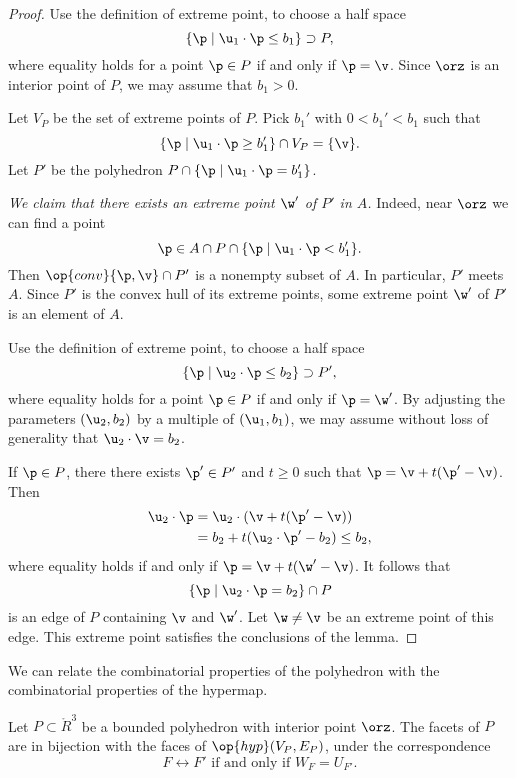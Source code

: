 \begin{proof}  Use the definition of extreme point, to choose a half space
\[
\{ \p \mid \u_1\cdot \p \le b_1\} \supset P,
\]
where equality holds for a point $\p\in P$ if and only if $\p=\v$.
Since $\orz$ is an interior point of $P$, we may assume that $b_1 >0$.

Let $V_P$ be the set of extreme points of $P$.
Pick $b_1'$ with $0<b_1'<b_1$ such that
\[
\{\p \mid \u_1\cdot \p \ge b_1' \} \cap V_P = \{\v\}.
\]
Let $P'$ be the polyhedron 
$P \cap \{\p \mid \u_1 \cdot \p = b_1'\}$.  

{\it We claim that there exists an extreme point $\w'$ of $P'$
in $A$.}  Indeed, near $\orz$ we can find a point 
\[
\p \in A \cap P \cap \{ \p \mid \u_1\cdot \p < b_1'\}.
\]
Then $\op{conv}\{\p,\v\}\cap P'$ is a nonempty subset of $A$.  In
particular, $P'$ meets $A$.  Since $P'$ is the convex hull of its
extreme points, some extreme point $\w'$ of $P'$ is an element of $A$.

Use the definition of extreme point, to choose a half space
\[
\{ \p \mid \u_2 \cdot \p \le b_2\} \supset P',
\]
where equality holds for a point $\p\in P$ if and only if $\p=\w'$.
By adjusting the parameters $(\u_2,b_2)$ by a multiple of
$(\u_1,b_1)$, we may assume without loss of generality that $\u_2\cdot
\v = b_2$.

If $\p\in P$, there there exists $\p'\in P'$ and $t\ge0$ such that $\p
= \v + t (\p'-\v)$.  Then
\begin{align*}
\u_2\cdot \p &= \u_2\cdot (\v + t (\p'-\v))\\
&= b_2 + t (\u_2\cdot \p' - b_2) \le b_2,
\end{align*}
where equality holds if and only if $\p = \v + t (\w' - \v)$.   It
follows that
\[
\{\p \mid \u_2 \cdot \p = b_2\} \cap P
\]
is an edge of $P$ containing $\v$ and $\w'$.  Let $\w\ne\v$ be an
extreme point of this edge.  This extreme point satisfies the
conclusions of the lemma.
\end{proof}

We can relate the combinatorial properties of the polyhedron with the
combinatorial properties of the hypermap.

\begin{lemma}[]\cutrate{}\label{lemma:facet-bi}
Let $P\subset\ring{R}^3$ be a bounded polyhedron with interior point
$\orz$.  The facets of $P$ are in bijection with the faces of
$\op{hyp}(V_P,E_P)$, under the correspondence
\[ 
F\leftrightarrow F' \text{ if and only if } W_F = U_{F'}.
\] 
\end{lemma}

